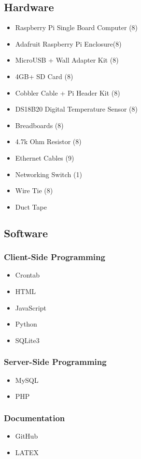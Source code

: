 \documentclass{article}
\begin{document}
		\subsection{Hardware}
			\begin{itemize}
				\item Raspberry Pi Single Board Computer (8)
				\item Adafruit Raspberry Pi Enclosure(8)
				\item MicroUSB + Wall Adapter Kit (8)
				\item 4GB+ SD Card (8)
				\item Cobbler Cable + Pi Header Kit (8)
				\item DS18B20 Digital Temperature Sensor (8)
				\item Breadboards (8)
				\item 4.7k Ohm Resistor (8)
				\item Ethernet Cables (9)
				\item Networking Switch (1)
				\item Wire Tie (8)
				\item Duct Tape
			\end{itemize}
			
		\subsection{Software}
			\subsubsection{Client-Side Programming}
				\begin{itemize}
					\item Crontab
					\item HTML
					\item JavaScript
					\item Python
					\item SQLite3						
				\end{itemize}	
			\subsubsection{Server-Side Programming}
				\begin{itemize}
					\item MySQL
					\item PHP									
				\end{itemize}
			\subsubsection{Documentation}
				\begin{itemize}			
					\item GitHub
					\item LATEX
				\end{itemize}
		
\end{document}
